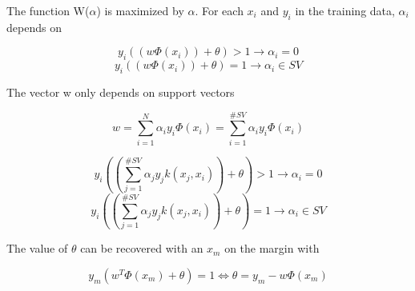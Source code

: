 \documentclass[11pt,abstract=on]{scrartcl}
\begin{document}
The function W($\alpha$) is maximized by $\alpha$. For each $x_i$ and $y_i$ in the training data, $\alpha_i$ depends on

\begin{equation*}
y_i((w \Phi(x_i)) + \theta) > 1 \rightarrow \alpha_i = 0
\end{equation*}
\begin{equation*}
y_i((w \Phi(x_i)) + \theta) = 1 \rightarrow \alpha_i \in SV
\end{equation*}

The vector w only depends on support vectors

\begin{equation*}
w = \sum\limits_{i=1}^{N} \alpha_i y_i \Phi(x_i) = \sum\limits_{i=1}^{\#SV} \alpha_i y_i \Phi(x_i)
\end{equation*}

\begin{equation*}
y_i((\sum\limits_{j=1}^{\#SV} \alpha_j y_j k(x_j, x_i)) + \theta) > 1 \rightarrow \alpha_i = 0
\end{equation*}
\begin{equation*}
y_i((\sum\limits_{j=1}^{\#SV} \alpha_j y_j k(x_j, x_i)) + \theta) = 1 \rightarrow \alpha_i \in SV
\end{equation*}

The value of $\theta$ can be recovered with an $x_m$ on the margin with

\begin{equation*}
y_m (w^T \Phi(x_m) + \theta) = 1 \Leftrightarrow \theta = y_m - w \Phi(x_m)
\end{equation*}
\end{document}
